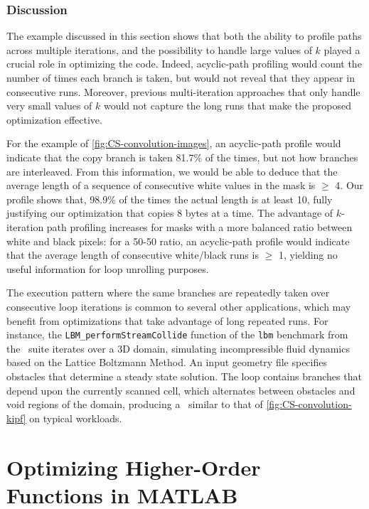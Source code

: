 \subsubsection*{Discussion}
The example discussed in this section shows that both the ability to profile paths across multiple iterations, and the possibility to handle large values of $k$ played a crucial role in optimizing the code. Indeed, acyclic-path profiling would count the number of times each branch is taken, but would not reveal that they appear in consecutive runs. Moreover, previous multi-iteration approaches that only handle very small values of $k$ would not capture the long runs that make the proposed optimization effective. 

For the example of \myfigure\ref{fig:CS-convolution-images}, an acyclic-path profile would indicate that the copy branch is taken 81.7\% of the times, but not how branches are interleaved. From this information, we would be able to deduce that the average length of a sequence of consecutive white values in the mask is $\ge$ 4. Our profile shows that, 98.9\% of the times the actual length is at least 10, fully justifying our optimization that copies 8 bytes at a time. The advantage of $k$-iteration path profiling increases for masks with a more balanced ratio between white and black pixels: for a 50-50 ratio, an acyclic-path profile would indicate that the average length of consecutive white/black runs is $\ge$ 1, yielding no useful information for loop unrolling purposes.

The execution pattern where the same branches are repeatedly taken over consecutive loop iterations is common to several other applications, which may benefit from optimizations that take advantage of long repeated runs. For instance, the {\tt LBM\_performStreamCollide} function of the {\tt lbm} benchmark from the \speccpu\ suite iterates over a 3D domain, simulating incompressible fluid dynamics based on the Lattice Boltzmann Method. An input geometry file specifies obstacles that determine a steady state solution. The loop contains branches that depend upon the currently scanned cell, which alternates between obstacles and void regions of the domain, producing a \kipf\ similar to that of \myfigure\ref{fig:CS-convolution-kipf} on typical workloads.

\section{Optimizing Higher-Order Functions in MATLAB}